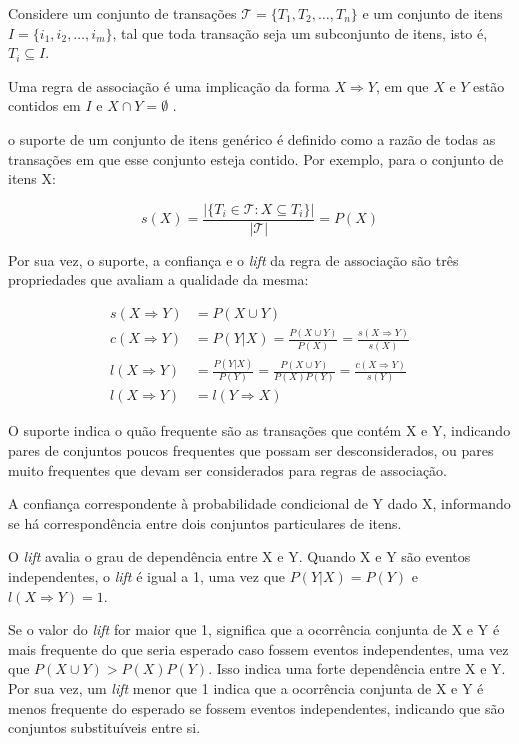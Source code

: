 Considere um conjunto de transações $\mathcal{T} = \{T_1, T_2, \dots, T_n\}$ e
um conjunto de itens $I = \{i_1, i_2, \dots, i_m\}$, tal que toda transação seja
um subconjunto de itens, isto é, $T_i \subseteq I$.

Uma regra de associação é uma
implicação da forma $X \Rightarrow Y$, em que $X$ e $Y$ estão contidos em $I$ e
$X \cap Y = \emptyset$ \cite{ordonez2011evaluating}.

o suporte de um conjunto de itens genérico é definido como a razão de todas as
transações em que esse conjunto esteja contido. Por exemplo, para o conjunto de
itens X:

\begin{equation}
s(X) = \frac{|\{T_i \in \mathcal{T} : X \subseteq T_i\}|}{|\mathcal{T}|} = P(X)
\end{equation}

Por sua vez, o suporte, a confiança e o \textit{lift} da regra de associação são três
propriedades que avaliam a qualidade da mesma:

\begin{align}
    s(X \Rightarrow Y) &= P( X \cup Y ) \\
    c(X \Rightarrow Y) &= P(Y|X) = \frac{P(X \cup Y)}{P(X)} = \frac{s(X \Rightarrow Y)}{s(X)}  \\
    l(X \Rightarrow Y) &= \frac{P(Y|X)}{P(Y)} = \frac{P(X \cup Y)}{P(X)P(Y)} = \frac{c(X \Rightarrow Y)}{s(Y)}\\
    l(X \Rightarrow Y) &= l(Y \Rightarrow X) 
\end{align}

O suporte indica o quão frequente são as transações que contém X e Y, indicando
pares de conjuntos poucos frequentes que possam ser desconsiderados, ou pares
muito frequentes que devam ser considerados para regras de associação.

A confiança correspondente à probabilidade condicional de Y dado X, informando
se há correspondência entre dois conjuntos particulares de itens.

O \textit{lift} avalia o grau de dependência entre X e Y. Quando X e Y são
eventos independentes, o \textit{lift} é igual a 1, uma vez que $P(Y|X) = P(Y)$ e $l(X
\Rightarrow Y) = 1$.

Se o valor do \textit{lift} for maior que 1, significa que a
ocorrência conjunta de X e Y é mais frequente do que seria esperado caso fossem
eventos independentes, uma vez que $P(X \cup Y) > P(X)P(Y)$. Isso indica uma
forte dependência entre X e Y. Por sua vez, um \textit{lift}  menor que 1 indica
que a ocorrência conjunta de X e Y é menos frequente do esperado se fossem
eventos independentes, indicando que são conjuntos substituíveis entre si.

